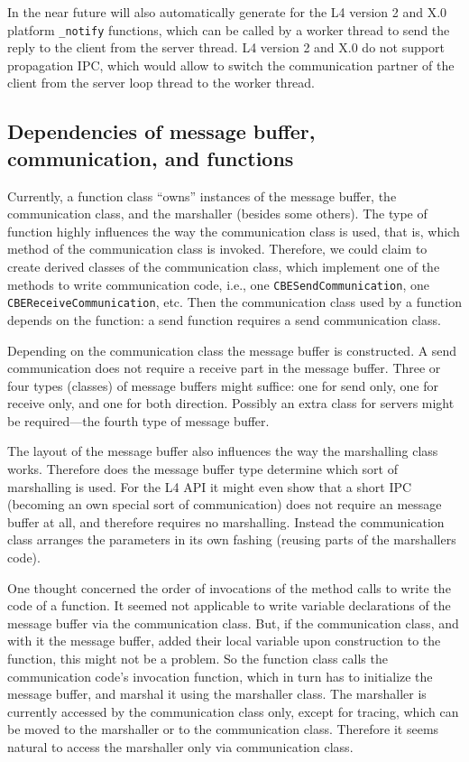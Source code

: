In the near future \dice{} will also automatically generate for the
L4 version 2 and X.0 platform \verb|_notify| functions, which can be called
by a worker thread to send the reply to the client from the server thread.
L4 version 2 and X.0 do not support propagation IPC, which would allow to
switch the communication partner of the client from the server loop thread
to the worker thread.

\subsection{Dependencies of message buffer, communication, and functions}

Currently, a function class ``owns'' instances of the message buffer, the 
communication class, and the marshaller (besides some others).  The type of 
function highly influences the way the communication class is used, that is, 
which method of the communication class is invoked.  Therefore, we could claim 
to create derived classes of the communication class, which implement one of 
the methods to write communication code, i.e., one 
\texttt{CBESendCommunication}, one \texttt{CBEReceiveCommunication}, etc.  Then
the communication class used by a function depends on the function: a send
function requires a send communication class.

Depending on the communication class the message buffer is constructed.  A
send communication does not require a receive part in the message buffer.
Three or four types (classes) of message buffers might suffice: one for send
only, one for receive only, and one for both direction.  Possibly an extra
class for servers might be required---the fourth type of message buffer.

The layout of the message buffer also influences the way the marshalling class
works.  Therefore does the message buffer type determine which sort of
marshalling is used.  For the L4 API it might even show that a short IPC
(becoming an own special sort of communication) does not require an message
buffer at all, and therefore requires no marshalling.  Instead the
communication class arranges the parameters in its own fashing (reusing parts
of the marshallers code).

One thought concerned the order of invocations of the method calls to write
the code of a function.  It seemed not applicable to write variable
declarations of the message buffer via the communication class.  But, if the
communication class, and with it the message buffer, added their local
variable upon construction to the function, this might not be a problem.  So
the function class calls the communication code's invocation function, which
in turn has to initialize the message buffer, and marshal it using the
marshaller class.  The marshaller is currently accessed by the communication
class only, except for tracing, which can be moved to the marshaller or to the
communication class.  Therefore it seems natural to access the marshaller only
via communication class.

